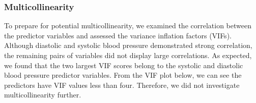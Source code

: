 \documentclass[10pt]{article}
\begin{document}
\begin{figure}[hbt!]
\hspace*{\fill}
\centering
{}\hspace{2em}%
%
\hspace*{\fill}
\end{figure}


\subsubsection*{Multicollinearity}

To prepare for potential multicollinearity, we examined the correlation between the predictor variables and assessed the variance inflation factors (VIFs). Although diastolic and systolic blood pressure demonstrated strong correlation, the remaining pairs of variables did not display large correlations. As expected, we found that the two largest VIF scores belong to the systolic and diastolic blood pressure predictor variables. From the VIF plot below, we can see the predictors have VIF values less than four. Therefore, we did not investigate multicollinearity further. 
\end{document}
